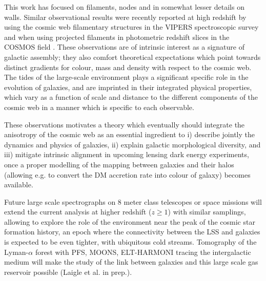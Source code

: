 \documentclass[useAMS,usenatbib]{mnras}
\begin{document}
This work has focused on filaments, nodes and in somewhat lesser details on walls. 
Similar observational results were recently reported at high redshift  by using the cosmic web filamentary structures in the VIPERS spectroscopic survey \citep{Malavasi2017} and when using  projected filaments in photometric redshift slices in the COSMOS field \citep{Laigle2017}.
These observations   are of intrinsic interest as a signature of galactic assembly; they also comfort theoretical expectations which point towards distinct gradients for colour, mass and density with respect to the cosmic web. The tides of the large-scale environment plays a significant specific role in the evolution of galaxies, and are  imprinted in their integrated physical properties,  which vary as a function of scale and distance to the different components of the cosmic web in a manner which is specific to each observable. 

These observations motivates a theory which eventually should integrate the anisotropy of the cosmic web as an essential ingredient  to i)  describe jointly  the dynamics and physics of galaxies, ii) explain galactic  morphological diversity, and iii) mitigate intrinsic alignment in upcoming lensing dark energy experiments, 
once a proper modelling of the mapping between galaxies and their halos (allowing e.g. to convert the DM accretion rate into colour of galaxy) becomes available.

Future large scale spectrographs on 8 meter class telescopes 
\citep[MOONS\footnote{Multi-Object Optical and Near-infrared Spectrograph};][PFS\footnote{Prime Focus Spectrograph; \href{http://pfs.ipmu.jp/}{http://pfs.ipmu.jp/}}; \citealp{Pfs}]{Moons1,Moons2} or space missions \citep[WFIRST\footnote{Wide-Field Infrared Survey Telescope; \href{http://wfirst.gsfc.nasa.gov}{http://wfirst.gsfc.nasa.gov}};][and Euclid\footnote{\href{http://sci.esa.int/euclid/}{http://sci.esa.int/euclid/}, \href{http://www.euclid-ec.org}{http://www.euclid-ec.org}}; \citealp{Euclid}, the deep survey for the latter]{Wfirst1,Wfirst2}
will extend the current analysis at higher redshift ($z \ge 1$) with similar samplings, allowing to explore the role of the environment near the peak of the cosmic star formation history, an epoch where the connectivity between the LSS and galaxies is expected to be even tighter, with ubiquitous cold streams. Tomography of the Lyman-$\alpha$ forest with PFS, MOONS, ELT-HARMONI \citep{Harmoni} tracing the intergalactic medium will make the study of the link between galaxies and this large scale gas reservoir possible (Laigle et al. in prep.).
 
\end{document}
